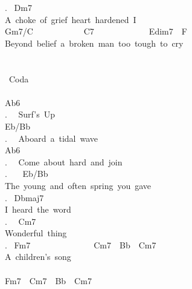 {. \ Dm7\\
A\ choke\ of\ grief\ heart\ hardened\ I\\
Gm7/C\ \ \ \ \ \ \ \ \ \ \ \ C7\ \ \ \ \ \ \ \ \ \ \ \ \ Edim7\ \ F\\
Beyond\ belief\ a\ broken\ man\ too\ tough\ to\ cry\\
\\
\\
\lbrack\ Coda\rbrack\\
\\
Ab6\\
. \ \ Surf's\ Up\\
Eb/Bb\\
. \ \ Aboard\ a\ tidal\ wave\\
Ab6\\
. \ \ Come\ about\ hard\ and\ join\\
. \ \ \ Eb/Bb\\
The\ young\ and\ often\ spring\ you\ gave\\
. \ Dbmaj7\\
I\ heard\ the\ word\\
. \ \ Cm7\\
Wonderful\ thing\\
. \ Fm7\ \ \ \ \ \ \ \ \ \ \ \ \ \ \ Cm7\ \ Bb\ \ Cm7\\
A\ children's\ song\ \ \\
\\
Fm7\ \ Cm7\ \ Bb\ \ Cm7\ }
